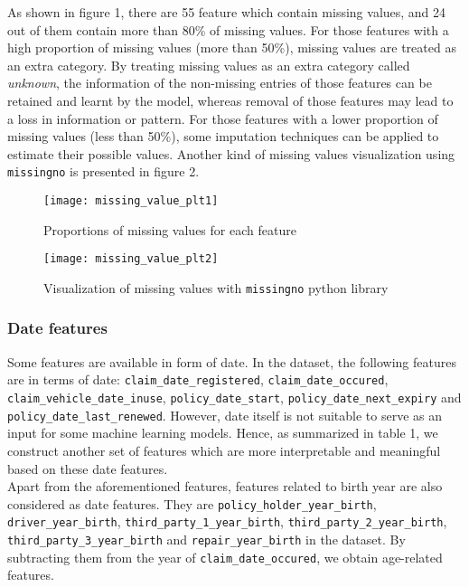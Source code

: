 \documentclass[12pt]{article}
\begin{document}
As shown in figure 1, there are 55 feature which contain missing values, and 24 out of them contain more than 80\% of missing values. For those features with a high proportion of missing values (more than 50\%), missing values are treated as an extra category. By treating missing values as an extra category called \textit{unknown}, the information of the non-missing entries of those features can be retained and learnt by the model, whereas removal of those features may lead to a loss in information or pattern. For those features with a lower proportion of missing values (less than 50\%), some imputation techniques can be applied to estimate their possible values. Another kind of missing values visualization using \texttt{missingno} is presented in figure 2. 

\begin{figure}[h]
\centering
\texttt{[image: missing\_value\_plt1]}
\caption{Proportions of missing values for each feature}
\end{figure}

\begin{figure}[h]
\centering
\texttt{[image: missing\_value\_plt2]}
\caption{Visualization of missing values with \texttt{missingno} python library}
\end{figure}

\subsubsection*{Date features}

Some features are available in form of date. In the dataset, the following features are in terms of date: \texttt{claim\_date\_registered}, \texttt{claim\_date\_occured}, \texttt{claim\_vehicle\_date\_inuse}, \texttt{policy\_date\_start}, \texttt{policy\_date\_next\_expiry} and \texttt{policy\_date\_last\_renewed}. However, date itself is not suitable to serve as an input for some machine learning models. Hence, as summarized in table 1, we construct another set of features which are more interpretable and meaningful based on these date features.\\

Apart from the aforementioned features, features related to birth year are also considered as date features. They are \texttt{policy\_holder\_year\_birth}, \texttt{driver\_year\_birth}, \texttt{third\_party\_1\_year\_birth}, \texttt{third\_party\_2\_year\_birth}, \texttt{third\_party\_3\_year\_birth} and \texttt{repair\_year\_birth} in the dataset. By subtracting them from the year of \texttt{claim\_date\_occured}, we obtain age-related features.
\end{document}
